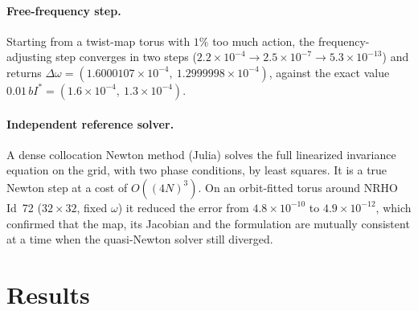 \documentclass[11pt]{article}
\begin{document}
\paragraph{Free-frequency step.} Starting from a twist-map torus with $1\%$ too much action, the
frequency-adjusting step converges in two steps
($2.2\times10^{-4}\to2.5\times10^{-7}\to5.3\times10^{-13}$) and returns
$\Delta\omega = (1.6000107\times10^{-4},\ 1.2999998\times10^{-4})$, against the exact value
$0.01\,bI^* = (1.6\times10^{-4},\ 1.3\times10^{-4})$.

\paragraph{Independent reference solver.} A dense collocation Newton method (Julia) solves the
full linearized invariance equation on the grid, with two phase conditions, by least squares. It
is a true Newton step at a cost of $O((4N)^3)$. On an orbit-fitted torus around NRHO Id~72
($32\times32$, fixed $\omega$) it reduced the error from $4.8\times10^{-10}$ to
$4.9\times10^{-12}$, which confirmed that the map, its Jacobian and the formulation are mutually
consistent at a time when the quasi-Newton solver still diverged.

\section{Results}\label{sec:results}
\end{document}
